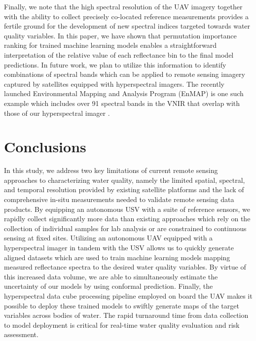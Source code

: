 \documentclass[remotesensing,article,submit,pdftex,moreauthors]{Definitions/mdpi}
\begin{document}
Finally, we note that the high spectral resolution of the UAV imagery together with the ability to collect precisely co-located reference measurements provides a fertile ground for the development of new spectral indices targeted towards water quality variables. In this paper, we have shown that permutation importance ranking for trained machine learning models enables a straightforward interpretation of the relative value of each reflectance bin to the final model predictions. In future work, we plan to utilize this information to identify combinations of spectral bands which can be applied to remote sensing imagery captured by satellites equipped with hyperspectral imagers. The recently launched Environmental Mapping and Analysis Program (EnMAP) is one such example which includes over 91 spectral bands in the VNIR that overlap with those of our hyperspectral imager \cite{Storch2023TheEI}. 


\section{Conclusions}

In this study, we address two key limitations of current remote sensing approaches to characterizing water quality, namely the limited spatial, spectral, and temporal resolution provided by existing satellite platforms and the lack of comprehensive in-situ measurements needed to validate remote sensing data products. By equipping an autonomous USV with a suite of reference sensors, we rapidly collect significantly more data than existing approaches which rely on the collection of individual samples for lab analysis or are constrained to continuous sensing at fixed sites. Utilizing an autonomous UAV equipped with a hyperspectral imager in tandem with the USV allows us to quickly generate aligned datasets which are used to train machine learning models mapping measured reflectance spectra to the desired water quality variables. By virtue of this increased data volume, we are able to simultaneously estimate the uncertainty of our models by using conformal prediction. Finally, the hyperspectral data cube processing pipeline employed on board the UAV makes it possible to deploy these trained models to swiftly generate maps of the target variables across bodies of water. The rapid turnaround time from data collection to model deployment is critical for real-time water quality evaluation and risk assessment. 
\end{document}
